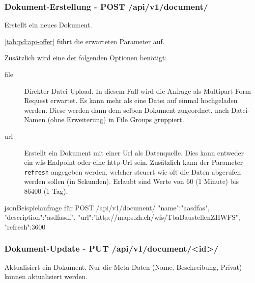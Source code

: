 \subsubsection{Dokument-Erstellung - POST /api/v1/document/}
Erstellt ein neues Dokument. 

\cref{tab:pd:api-offer} führt die erwarteten Parameter auf.

Zusätzlich wird eine der folgenden Optionen benötigt:
\begin{description}
\item[file] Direkter Datei-Upload. In diesem Fall wird die Anfrage als Multipart Form Request erwartet. Es kann mehr als eine Datei auf einmal hochgeladen werden. Diese werden dann dem selben Dokument zugeordnet, nach Datei-Namen (ohne Erweiterung) in File Groups gruppiert.
\item[url] Erstellt ein Dokument mit einer Url als Datenquelle. Dies kann entweder ein \gls{wfs}-Endpoint oder eine http-Url sein. Zusätzlich kann der Parameter \texttt{refresh} angegeben werden, welcher steuert wie oft die Daten abgerufen werden sollen (in Sekunden). Erlaubt sind Werte von 60 (1 Minute) bis 86400 (1 Tag).
\end{description}

\begin{srclst}{json}{Beispielanfrage für POST /api/v1/document/}
{
  "name":"aasdfas",
  "description":"asdfasdf",
  "url":"http://maps.zh.ch/wfs/TbaBaustellenZHWFS",
  "refresh":3600
}
\end{srclst}

\subsubsection{Dokument-Update - PUT /api/v1/document/<id>/}
Aktualisiert ein Dokument. Nur die Meta-Daten (Name, Beschreibung, Privat) können aktualisiert werden.

